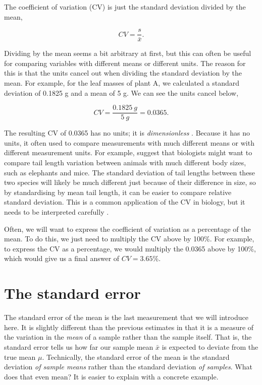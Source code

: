 \documentclass[
  openany]{krantz}
\begin{document}
The coefficient of variation (CV) is just the standard deviation divided by the mean,

\[CV = \frac{s}{\bar{x}}.\]

Dividing by the mean seems a bit arbitrary at first, but this can often be useful for comparing variables with different means or different units.
The reason for this is that the units cancel out when dividing the standard deviation by the mean.
For example, for the leaf masses of plant A, we calculated a standard deviation of 0.1825 g and a mean of 5 g.
We can see the units cancel below,

\[CV = \frac{0.1825\:g}{5\:g} = 0.0365.\]

The resulting CV of 0.0365 has no units; it is \emph{dimensionless} \citep{Lande1977}.
Because it has no units, it often used to compare measurements with much different means or with different measurement units.
For example, \citet{Sokal1995} suggest that biologists might want to compare tail length variation between animals with much different body sizes, such as elephants and mice.
The standard deviation of tail lengths between these two species will likely be much different just because of their difference in size, so by standardising by mean tail length, it can be easier to compare relative standard deviation.
This is a common application of the CV in biology, but it needs to be interpreted carefully \citep{Pelabon2020}.

Often, we will want to express the coefficient of variation as a percentage of the mean.
To do this, we just need to multiply the CV above by 100\%.
For example, to express the CV as a percentage, we would multiply the 0.0365 above by 100\%, which would give us a final answer of \(CV = 3.65\)\%.

\hypertarget{the-standard-error}{%
\section{The standard error}\label{the-standard-error}}

The standard error of the mean is the last measurement that we will introduce here.
It is slightly different than the previous estimates in that it is a measure of the variation in the \emph{mean} of a sample rather than the sample itself.
That is, the standard error tells us how far our sample mean \(\bar{x}\) is expected to deviate from the true mean \(\mu\).
Technically, the standard error of the mean is the standard deviation \emph{of sample means} rather than the standard deviation \emph{of samples}.
What does that even mean?
It is easier to explain with a concrete example.
\end{document}
